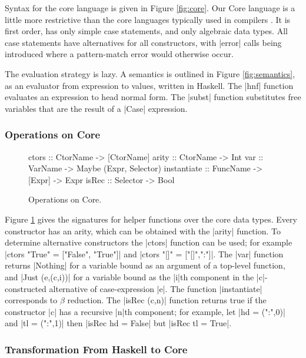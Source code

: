 \documentclass[preprint]{sigplanconf}
\begin{document}
Syntax for the core language is given in Figure \ref{fig:core}. Our Core language is a little more restrictive than the core languages typically used in compilers \cite{ghc_core}. It is first order, has only simple case statements, and only algebraic data types. All case statements have alternatives for all constructors, with |error| calls being introduced where a pattern-match error would otherwise occur.

The evaluation strategy is lazy. A semantics is outlined in Figure \ref{fig:semantics}, as an evaluator from expression to values, written in Haskell. The |hnf| function evaluates an expression to head normal form. The |subst| function substitutes free variables that are the result of a |Case| expression.

\subsubsection{Operations on Core}

\begin{figure}
\begin{code}
ctors        :: CtorName  -> [CtorName]
arity        :: CtorName  -> Int
var          :: VarName   -> Maybe (Expr, Selector)
instantiate  :: FuncName  -> [Expr] -> Expr
isRec        :: Selector  -> Bool
\end{code}
\caption{Operations on Core.}
\label{fig:core_operations}
\end{figure}

Figure \ref{fig:core_operations} gives the signatures for helper functions over the core data types. Every constructor has an arity, which can be obtained with the |arity| function. To determine alternative constructors the |ctors| function can be used; for example |ctors "True" = ["False", "True"]| and |ctors "[]" = ["[]",":"]|. The |var| function returns |Nothing| for a variable bound as an argument of a top-level function, and |Just (e,(c,i))| for a variable bound as the |i|th component in the |c|-constructed alternative of case-expression |e|. The function |instantiate| corresponds to $\beta$ reduction. The |isRec (c,n)| function returns true if the constructor |c| has a recursive |n|th component; for example, let |hd = (":",0)| and |tl = (":",1)| then |isRec hd = False| but |isRec tl = True|.

\subsubsection{Transformation From Haskell to Core}
\label{sec:transform}
\end{document}
